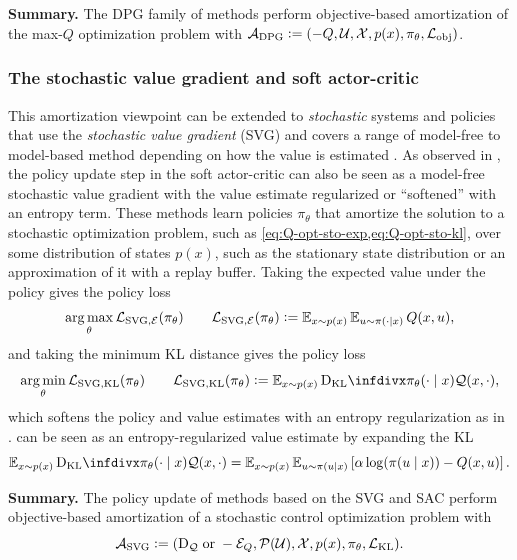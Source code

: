 \documentclass[twoside,11pt]{article}
\begin{document}
\textbf{Summary.}
The DPG family of methods perform objective-based
amortization of the max-$Q$ optimization problem with
${\mathcal{A}}_{\rm DPG}\vcentcolon= (-Q, {\mathcal{U}}, {\mathcal{X}}, p(x), \pi_\theta, {\mathcal{L}}_{\rm obj})$.

\subsubsection{The stochastic value gradient and soft actor-critic}
This amortization viewpoint can be extended to \emph{stochastic} systems
and policies that use the \emph{stochastic value gradient} (SVG)
and covers a range of model-free to model-based method depending on
how the value is estimated
\citep{byravan2019imagined,hafner2019dream,byravan2021evaluating,amos2021model}.
As observed in
\citet{haarnoja2018soft,amos2021model},
the policy update step in the soft actor-critic
can also be seen as a model-free
stochastic value gradient with the value estimate
regularized or ``softened'' with an entropy term.
These methods learn policies $\pi_\theta$ that
amortize the solution to a stochastic optimization
problem, such as \cref{eq:Q-opt-sto-exp,eq:Q-opt-sto-kl},
over some distribution of states $p(x)$, such as the
stationary state distribution or an approximation of it
with a replay buffer.
Taking the expected value under the policy gives
the policy loss
\begin{equation}
  \operatorname*{arg\,max}_\theta {\mathcal{L}}_{\rm SVG,{\mathcal{E}}}(\pi_\theta) \qquad {\mathcal{L}}_{\rm SVG,{\mathcal{E}}}(\pi_\theta)\vcentcolon= \operatorname{\mathbb{E}}_{x\sim p(x)} \operatorname{\mathbb{E}}_{u\sim\pi(\cdot|x)} Q(x, u),
  \label{eq:svg-loss-exp}
\end{equation}
and taking the minimum KL distance gives the policy loss
\begin{equation}
  \argmin_\theta \gL_{\rm SVG,KL}(\pi_\theta) \qquad \gL_{\rm SVG,KL}(\pi_\theta)\defeq \E_{x\sim p(x)} \kl{\pi_\theta(\cdot\mid x)}{\gQ(x, \cdot)},
  \label{eq:svg-loss-kl}
\end{equation}
which softens the policy and value estimates with an entropy regularization
as in \citet{haarnoja2018soft,amos2021model}.
 can be seen as an entropy-regularized value
estimate by expanding the KL
\begin{equation}
  \E_{x\sim p(x)} \kl{\pi_\theta(\cdot\mid x)}{\gQ(x, \cdot)} =
  \E_{x\sim p(x)} \E_{u\sim \pi(u\mid x)} \left[ \alpha\log(\pi(u\mid x)) - Q(x, u) \right].
\end{equation}

\textbf{Summary.}
The policy update of methods based on the SVG and SAC perform
objective-based amortization of a stochastic control
optimization problem with
\begin{equation*}
{\mathcal{A}}_{\rm SVG}\vcentcolon= (\mathrm{D}_{\mathcal{Q}}\;\mathrm{or}\;-{\mathcal{E}}_Q, {\mathcal{P}}({\mathcal{U}}), {\mathcal{X}}, p(x), \pi_\theta, {\mathcal{L}}_{\rm KL}).
\end{equation*}
\end{document}
